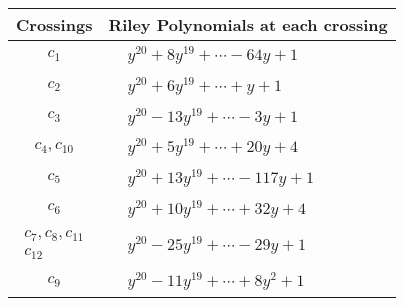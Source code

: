 \documentclass[1p]{elsarticle_modified}
\theoremstyle{definition}
\begin{document}
\begin{tabular}{m{50pt}|m{274pt}}
Crossings & \hspace{64pt}Riley Polynomials at each crossing \\
\hline $$\begin{aligned}c_{1}\end{aligned}$$&$\begin{aligned}
&y^{20}+8 y^{19}+\cdots-64 y+1
\end{aligned}$\\
\hline $$\begin{aligned}c_{2}\end{aligned}$$&$\begin{aligned}
&y^{20}+6 y^{19}+\cdots+y+1
\end{aligned}$\\
\hline $$\begin{aligned}c_{3}\end{aligned}$$&$\begin{aligned}
&y^{20}-13 y^{19}+\cdots-3 y+1
\end{aligned}$\\
\hline $$\begin{aligned}c_{4},c_{10}\end{aligned}$$&$\begin{aligned}
&y^{20}+5 y^{19}+\cdots+20 y+4
\end{aligned}$\\
\hline $$\begin{aligned}c_{5}\end{aligned}$$&$\begin{aligned}
&y^{20}+13 y^{19}+\cdots-117 y+1
\end{aligned}$\\
\hline $$\begin{aligned}c_{6}\end{aligned}$$&$\begin{aligned}
&y^{20}+10 y^{19}+\cdots+32 y+4
\end{aligned}$\\
\hline $$\begin{aligned}c_{7},c_{8},c_{11}\\c_{12}\end{aligned}$$&$\begin{aligned}
&y^{20}-25 y^{19}+\cdots-29 y+1
\end{aligned}$\\
\hline $$\begin{aligned}c_{9}\end{aligned}$$&$\begin{aligned}
&y^{20}-11 y^{19}+\cdots+8 y^2+1
\end{aligned}$\\
\hline
\end{tabular}\\~\\
\end{document}
